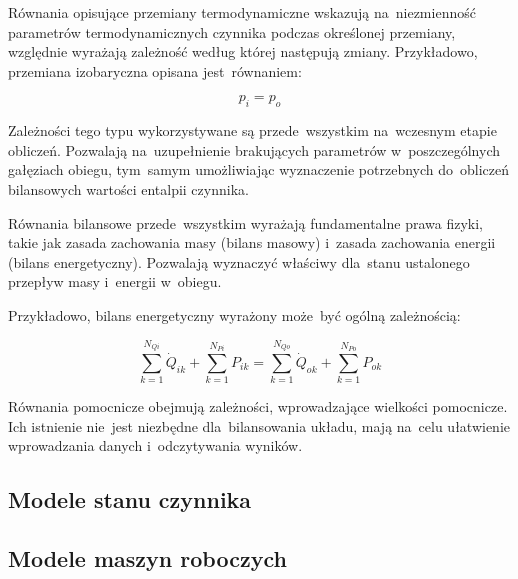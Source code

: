 Równania opisujące przemiany termodynamiczne wskazują na~niezmienność
parametrów termodynamicznych czynnika podczas określonej przemiany,
względnie wyrażają zależność według której następują zmiany.
Przykładowo, przemiana izobaryczna opisana jest~równaniem:

\begin{equation}
	p_i = p_o
\end{equation}

Zależności tego typu wykorzystywane są przede~wszystkim na~wczesnym
etapie obliczeń. Pozwalają na~uzupełnienie brakujących parametrów
w~poszczególnych gałęziach obiegu, tym~samym umożliwiając wyznaczenie
potrzebnych do~obliczeń bilansowych wartości entalpii czynnika.

Równania bilansowe przede~wszystkim wyrażają fundamentalne prawa fizyki,
takie jak zasada zachowania masy (bilans masowy) i~zasada zachowania
energii (bilans energetyczny). Pozwalają wyznaczyć właściwy dla~stanu
ustalonego przepływ masy i~energii w~obiegu.

Przykładowo, bilans energetyczny wyrażony może~być ogólną zależnością:

\begin{equation}
	\sum_{k=1}^{N_{Qi}}{\dot Q_{ik}} + \sum_{k=1}^{N_{Pi}}{P_{ik}}
	= \sum_{k=1}^{N_{Qo}}{\dot Q_{ok}} + \sum_{k=1}^{N_{Po}}{P_{ok}}
\end{equation}

Równania pomocnicze obejmują zależności, wprowadzające wielkości
pomocnicze. Ich istnienie nie~jest niezbędne dla~bilansowania układu,
mają na~celu ułatwienie wprowadzania danych i~odczytywania wyników.


\subsection{Modele stanu czynnika}





\subsection{Modele maszyn roboczych}

\newcommand\wykresTs[2][]{
	\subfloat[][Wykres T-s przemiany]{
		\begin{tikzpicture}
			\begin{axis}[
				xtick=\empty,
				ytick=\empty,
				axis lines=left,
				ylabel=T,
				xlabel=s,
				height=5cm,
				clip=false,
				every axis x label/.style={at={(xticklabel cs:.95,.2cm)}},
				every axis y label/.style={at={(yticklabel cs:.9,.2cm)}},
				#1
			]
				\addplot+[no marks, smooth] table[x=s, y=T] {wykresy/_nasyc.txt};
				#2
			\end{axis}
		\end{tikzpicture}
	}
}





